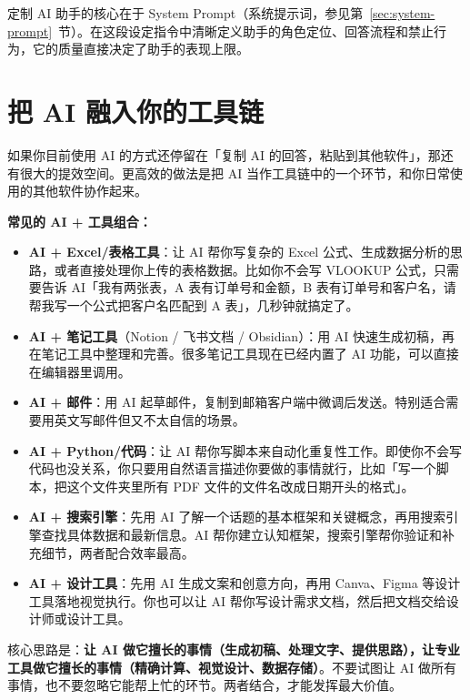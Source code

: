 \begin{tipbox}
定制 AI 助手的核心在于 System Prompt（系统提示词，参见第~\ref{sec:system-prompt}~节）。在这段设定指令中清晰定义助手的角色定位、回答流程和禁止行为，它的质量直接决定了助手的表现上限。
\end{tipbox}

\section{把 AI 融入你的工具链}

如果你目前使用 AI 的方式还停留在「复制 AI 的回答，粘贴到其他软件」，那还有很大的提效空间。更高效的做法是把 AI 当作工具链中的一个环节，和你日常使用的其他软件协作起来。

\textbf{常见的 AI + 工具组合：}

\begin{itemize}
  \item \textbf{AI + Excel/表格工具}：让 AI 帮你写复杂的 Excel 公式、生成数据分析的思路，或者直接处理你上传的表格数据。比如你不会写 VLOOKUP 公式，只需要告诉 AI「我有两张表，A 表有订单号和金额，B 表有订单号和客户名，请帮我写一个公式把客户名匹配到 A 表」，几秒钟就搞定了。
  \item \textbf{AI + 笔记工具}（Notion / 飞书文档 / Obsidian）：用 AI 快速生成初稿，再在笔记工具中整理和完善。很多笔记工具现在已经内置了 AI 功能，可以直接在编辑器里调用。
  \item \textbf{AI + 邮件}：用 AI 起草邮件，复制到邮箱客户端中微调后发送。特别适合需要用英文写邮件但又不太自信的场景。
  \item \textbf{AI + Python/代码}：让 AI 帮你写脚本来自动化重复性工作。即使你不会写代码也没关系，你只要用自然语言描述你要做的事情就行，比如「写一个脚本，把这个文件夹里所有 PDF 文件的文件名改成日期开头的格式」。
  \item \textbf{AI + 搜索引擎}：先用 AI 了解一个话题的基本框架和关键概念，再用搜索引擎查找具体数据和最新信息。AI 帮你建立认知框架，搜索引擎帮你验证和补充细节，两者配合效率最高。
  \item \textbf{AI + 设计工具}：先用 AI 生成文案和创意方向，再用 Canva、Figma 等设计工具落地视觉执行。你也可以让 AI 帮你写设计需求文档，然后把文档交给设计师或设计工具。
\end{itemize}

核心思路是：\textbf{让 AI 做它擅长的事情（生成初稿、处理文字、提供思路），让专业工具做它擅长的事情（精确计算、视觉设计、数据存储）}。不要试图让 AI 做所有事情，也不要忽略它能帮上忙的环节。两者结合，才能发挥最大价值。

